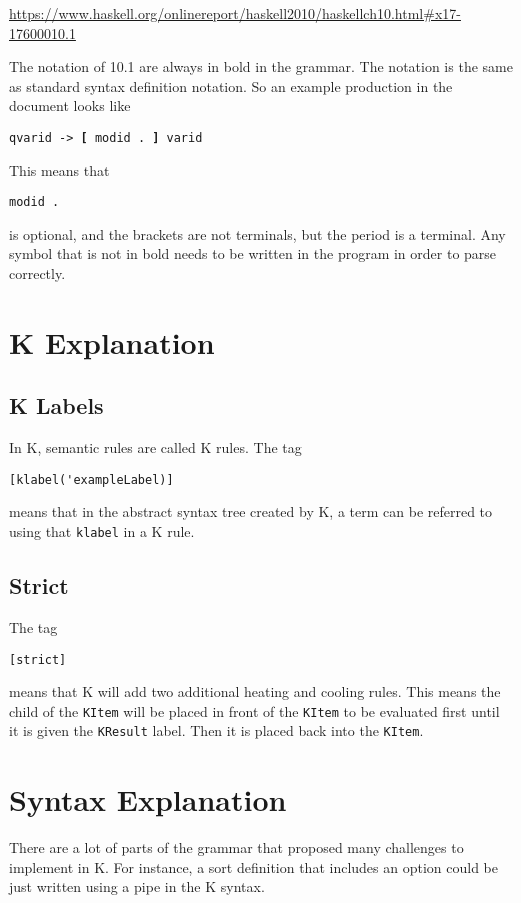 \url{https://www.haskell.org/onlinereport/haskell2010/haskellch10.html#x17-17600010.1}

The notation of 10.1 are always in bold in the grammar. The notation is the same as standard syntax definition notation.
So an example production in the document looks like

\texttt{qvarid -> \textbf{[} modid . \textbf{]} varid}

This means that 

\begin{lstlisting}
modid .
\end{lstlisting}

is optional, and the brackets are not terminals, but the period is a terminal. Any symbol that is not in bold needs to be written in the program in order to parse correctly.

\section{K Explanation}
\subsection{K Labels}
In K, semantic rules are called K rules. The tag

\begin{lstlisting}
[klabel('exampleLabel)]
\end{lstlisting}

means that in the abstract syntax tree created by K, a term can be referred to using that \texttt{klabel} in a K rule.

\subsection{Strict}
The tag

\begin{lstlisting}
[strict]
\end{lstlisting}

means that K will add two additional heating and cooling rules. This means the child of the \texttt{KItem} will be placed in front of the \texttt{KItem} to be evaluated first until it is given the \texttt{KResult} label. Then it is placed back into the \texttt{KItem}.

\section{Syntax Explanation}
There are a lot of parts of the grammar that proposed many challenges to implement in K. For instance, a sort definition that includes an option could be just written using a pipe
in the K syntax.

